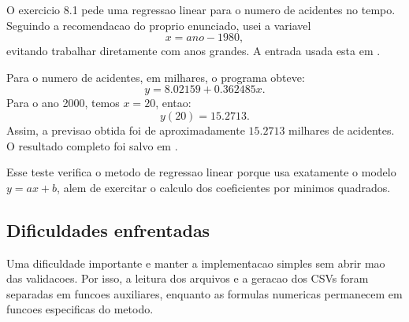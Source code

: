 \documentclass[../main.tex]{subfiles}
\begin{document}
O exercicio 8.1 pede uma regressao linear para o numero de acidentes no tempo.
Seguindo a recomendacao do proprio enunciado, usei a variavel
\[
    x = ano - 1980,
\]
evitando trabalhar diretamente com anos grandes. A entrada usada esta em
.

Para o numero de acidentes, em milhares, o programa obteve:
\[
    y = 8.02159 + 0.362485x.
\]
Para o ano 2000, temos \(x=20\), entao:
\[
    y(20) = 15.2713.
\]
Assim, a previsao obtida foi de aproximadamente \(15.2713\) milhares de
acidentes. O resultado completo foi salvo em
.

Esse teste verifica o metodo de regressao linear porque usa exatamente o modelo
\(y=ax+b\), alem de exercitar o calculo dos coeficientes por minimos quadrados.

\subsection{Dificuldades enfrentadas}

Uma dificuldade importante e manter a implementacao simples sem abrir mao das
validacoes. Por isso, a leitura dos arquivos e a geracao dos CSVs foram
separadas em funcoes auxiliares, enquanto as formulas numericas permanecem em
funcoes especificas do metodo.
\end{document}
